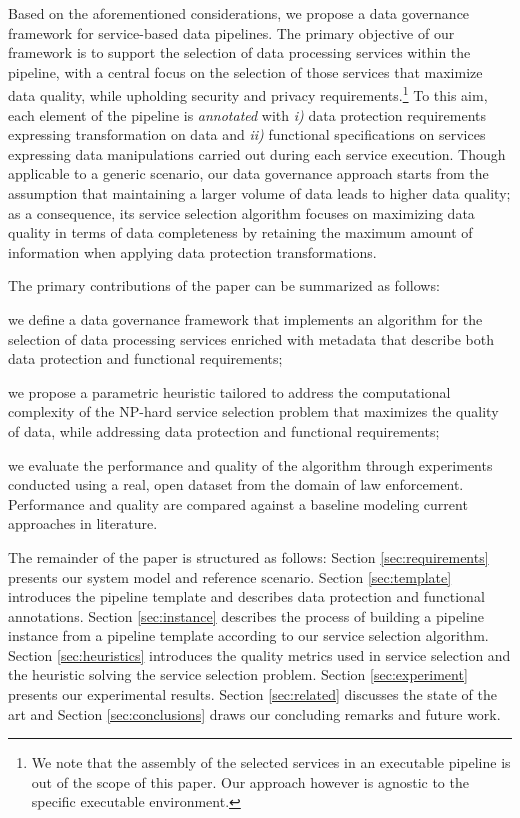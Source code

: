 Based on the aforementioned considerations, we propose a data governance framework for {\color{OurColor}service-based data pipelines}. 
The primary objective of our framework is to support the selection of data processing services within the pipeline, with a central focus on the selection of those services that {\color{OurColor}maximize} data quality, while upholding security and privacy requirements.\footnote{{\color{OurColor}We note that the assembly of the selected services in an executable pipeline is out of the scope of this paper. Our approach however is agnostic to the specific executable environment.}}
To this aim, each element of the pipeline is \textit{annotated} with \emph{i)} data protection requirements expressing transformation on data and \emph{ii)} functional specifications on services expressing data manipulations carried out during each service execution.
Though applicable to a generic scenario, our data governance approach starts from the assumption that maintaining a larger volume of data leads to higher data quality; as a consequence, its service selection algorithm focuses on maximizing data quality {\color{OurColor}in terms of data completeness} by retaining the maximum amount of information when applying data protection transformations.

The primary contributions of the paper can be summarized as follows:
\begin{enumerate*}
  \item we define a data governance framework {\color{OurColor}that implements an algorithm for the selection of data processing services} enriched with metadata that describe both data protection and functional requirements;
  \item we propose a parametric heuristic tailored to address the computational complexity of the NP-hard service selection problem {\color{OurColor}that maximizes the quality of data, while addressing data protection and functional requirements};
  \item we evaluate the performance and quality of the algorithm through experiments conducted using {\color{OurColor}a real, open dataset from the domain of law enforcement. Performance and quality are compared against a baseline modeling current approaches in literature.}
\end{enumerate*}

The remainder of the paper is structured as follows: Section \ref{sec:requirements} presents our system model and reference scenario. Section \ref{sec:template} introduces the pipeline template and describes data protection and functional annotations. Section \ref{sec:instance} describes the process of building a pipeline instance from a pipeline template according to our service selection algorithm. Section \ref{sec:heuristics} introduces the quality metrics used in service selection and the heuristic solving the service selection problem. Section \ref{sec:experiment} presents our experimental results. Section \ref{sec:related} discusses the state of the art and Section \ref{sec:conclusions} draws our concluding remarks and future work.